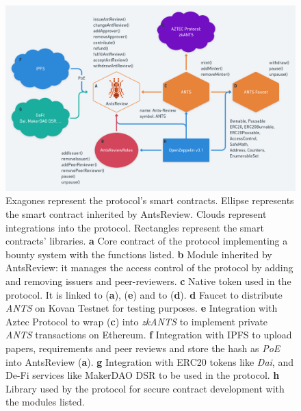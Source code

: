\documentclass[runningheads]{llncs}
\begin{document}
\begin{figure}[htp]
\centering
\includegraphics[scale=0.28]{AntsReview}
\caption{Exagones represent the protocol's smart contracts. Ellipse represents the smart contract inherited by AntsReview. Clouds represent integrations into the protocol. Rectangles represent the smart contracts' libraries.
\textbf{a} Core contract of the protocol implementing a bounty system with the functions listed.
\textbf{b} Module inherited by AntsReview: it manages the access control of the protocol by adding and removing issuers and peer-reviewers.
\textbf{c} Native token used in the protocol. It is linked to (\textbf{a}), (\textbf{e}) and to (\textbf{d}).
\textbf{d} Faucet to distribute \emph{ANTS} on Kovan Testnet for testing purposes. 
\textbf{e} Integration with Aztec Protocol to wrap (\textbf{c}) into \emph{zkANTS} to implement private \emph{ANTS} transactions on Ethereum.
\textbf{f} Integration with IPFS to upload papers, requirements and peer reviews and store the hash as \emph{PoE} into AntsReview (\textbf{a}).
\textbf{g} Integration with ERC20 tokens like \emph{Dai}, and De-Fi services like MakerDAO DSR to be used in the protocol.
\textbf{h} Library used by the protocol for secure contract development with the modules listed.}
\label{fig:contracts}
\end{figure}
\end{document}
